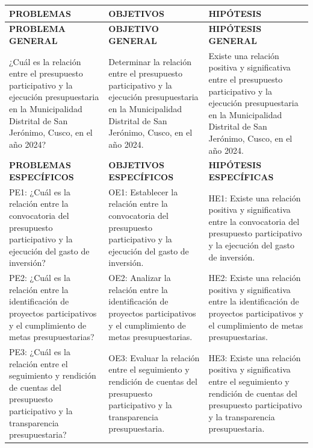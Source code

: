 \documentclass[
  man,
  floatsintext,
  longtable,
  a4paper,
  nolmodern,
  notxfonts,
  notimes,
  12pt,
  colorlinks=true,linkcolor=blue,citecolor=blue,urlcolor=blue]{apa7}
\newcounter{none} %
\begin{document}
{\def\LTcaptype{none} %
\begin{longtable}[]{@{}
  >{\raggedright\arraybackslash}p{}
  >{\raggedright\arraybackslash}p{}
  >{\raggedright\arraybackslash}p{}@{}}
\toprule\noalign{}
\begin{minipage}[b]{\linewidth}\raggedright
PROBLEMAS
\end{minipage} & \begin{minipage}[b]{\linewidth}\raggedright
OBJETIVOS
\end{minipage} & \begin{minipage}[b]{\linewidth}\raggedright
HIPÓTESIS
\end{minipage} \\
\midrule\noalign{}
\endhead
\bottomrule\noalign{}
\endlastfoot
\textbf{PROBLEMA GENERAL} & \textbf{OBJETIVO GENERAL} &
\textbf{HIPÓTESIS GENERAL} \\
¿Cuál es la relación entre el presupuesto participativo y la ejecución
presupuestaria en la Municipalidad Distrital de San Jerónimo, Cusco, en
el año 2024? & Determinar la relación entre el presupuesto participativo
y la ejecución presupuestaria en la Municipalidad Distrital de San
Jerónimo, Cusco, en el año 2024. & Existe una relación positiva y
significativa entre el presupuesto participativo y la ejecución
presupuestaria en la Municipalidad Distrital de San Jerónimo, Cusco, en
el año 2024. \\
\textbf{PROBLEMAS ESPECÍFICOS} & \textbf{OBJETIVOS ESPECÍFICOS} &
\textbf{HIPÓTESIS ESPECÍFICAS} \\
PE1: ¿Cuál es la relación entre la convocatoria del presupuesto
participativo y la ejecución del gasto de inversión? & OE1: Establecer
la relación entre la convocatoria del presupuesto participativo y la
ejecución del gasto de inversión. & HE1: Existe una relación positiva y
significativa entre la convocatoria del presupuesto participativo y la
ejecución del gasto de inversión. \\
PE2: ¿Cuál es la relación entre la identificación de proyectos
participativos y el cumplimiento de metas presupuestarias? & OE2:
Analizar la relación entre la identificación de proyectos participativos
y el cumplimiento de metas presupuestarias. & HE2: Existe una relación
positiva y significativa entre la identificación de proyectos
participativos y el cumplimiento de metas presupuestarias. \\
PE3: ¿Cuál es la relación entre el seguimiento y rendición de cuentas
del presupuesto participativo y la transparencia presupuestaria? & OE3:
Evaluar la relación entre el seguimiento y rendición de cuentas del
presupuesto participativo y la transparencia presupuestaria. & HE3:
Existe una relación positiva y significativa entre el seguimiento y
rendición de cuentas del presupuesto participativo y la transparencia
presupuestaria. \\
\end{longtable}
}
\end{document}
